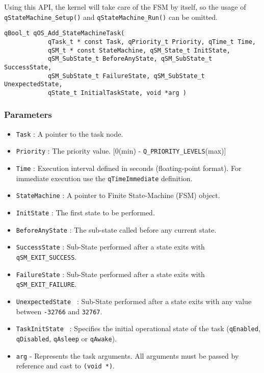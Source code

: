 Using this API, the kernel will take care of the FSM by itself, so the usage of \lstinline{qStateMachine_Setup()} and \lstinline{qStateMachine_Run()} can be omitted. 
\medskip

\begin{lstlisting}[style=CStyle]
qBool_t qOS_Add_StateMachineTask( 
            qTask_t * const Task, qPriority_t Priority, qTime_t Time,
            qSM_t * const StateMachine, qSM_State_t InitState, 
            qSM_SubState_t BeforeAnyState, qSM_SubState_t SuccessState, 
            qSM_SubState_t FailureState, qSM_SubState_t UnexpectedState,
            qState_t InitialTaskState, void *arg )
\end{lstlisting}

\subsubsection*{Parameters}
\begin{itemize}
    \item \lstinline{Task} : A pointer to the task node. 
    \item \lstinline{Priority} : The priority value. [0(min) - \lstinline{Q_PRIORITY_LEVELS}(max)]
    \item \lstinline{Time} : Execution interval defined in seconds (floating-point format). For immediate execution use the  \lstinline{qTimeImmediate} definition. 
    \item \lstinline{StateMachine} : A pointer to Finite State-Machine (FSM) object.
    \item \lstinline{InitState} :  The first state to be performed. 
    \item \lstinline{BeforeAnyState} :  The sub-state called before any current state.
    \item \lstinline{SuccessState} :  Sub-State performed after a state exits with \lstinline{qSM_EXIT_SUCCESS}.
    \item \lstinline{FailureState} :  Sub-State performed after a state exits with \lstinline{qSM_EXIT_FAILURE}.
    \item \lstinline{UnexpectedState } : Sub-State performed after a state exits with any value between \lstinline{-32766} and \lstinline{32767}.      
    \item \lstinline{TaskInitState } : Specifies the initial operational state of the task (\lstinline{qEnabled}, \lstinline{qDisabled}, \lstinline{qAsleep} or \lstinline{qAwake}).
    \item \lstinline{arg} - Represents the task arguments. All arguments must be passed by reference and cast to \lstinline{(void *)}. 
\end{itemize}

